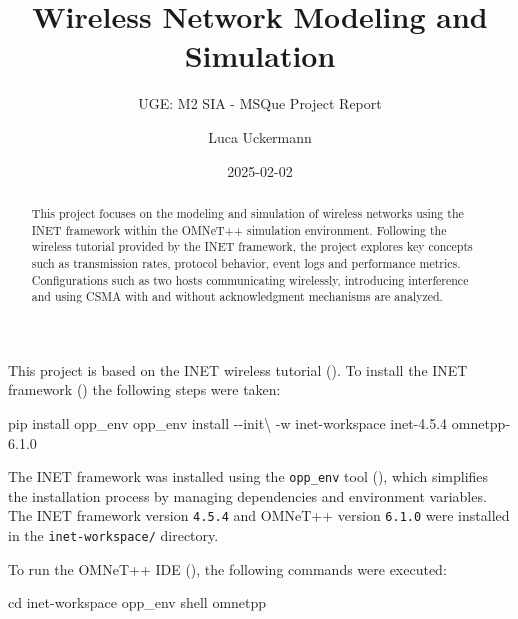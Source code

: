 \documentclass[
  letterpaper,
  DIV=11,
  numbers=noendperiod]{scrartcl}
\title{Wireless Network Modeling and Simulation}
\subtitle{UGE: M2 SIA - MSQue Project Report}
\author{Luca Uckermann}
\date{2025-02-02}
\newenvironment{Shaded}{\begin{snugshade}}{\end{snugshade}}
\newcommand{\AttributeTok}[1]{\textcolor[rgb]{0.40,0.45,0.13}{#1}}
\newcommand{\BuiltInTok}[1]{\textcolor[rgb]{0.00,0.23,0.31}{#1}}
\newcommand{\DataTypeTok}[1]{\textcolor[rgb]{0.68,0.00,0.00}{#1}}
\newcommand{\ExtensionTok}[1]{\textcolor[rgb]{0.00,0.23,0.31}{#1}}
\newcommand{\NormalTok}[1]{\textcolor[rgb]{0.00,0.23,0.31}{#1}}
\renewcommand*\contentsname{Table of contents}
\newcommand\contentsname{Table of contents}
\begin{document}
\maketitle
\begin{abstract}
This project focuses on the modeling and simulation of wireless networks
using the INET framework within the OMNeT++ simulation environment.
Following the wireless tutorial provided by the INET framework, the
project explores key concepts such as transmission rates, protocol
behavior, event logs and performance metrics. Configurations such as two
hosts communicating wirelessly, introducing interference and using CSMA
with and without acknowledgment mechanisms are analyzed.
\end{abstract}

\renewcommand*\contentsname{Table of contents}
{
\hypersetup{linkcolor=}
\setcounter{tocdepth}{2}
\tableofcontents
}

This project is based on the INET wireless tutorial
(). To
install the INET framework () the following steps were taken:

\begin{Shaded}
\begin{Highlighting}[]
\ExtensionTok{pip}\NormalTok{ install opp\_env}
\ExtensionTok{opp\_env}\NormalTok{ install }\AttributeTok{{-}{-}init}\DataTypeTok{\textbackslash{}}
  \AttributeTok{{-}w}\NormalTok{ inet{-}workspace inet{-}4.5.4 omnetpp{-}6.1.0}
\end{Highlighting}
\end{Shaded}

The INET framework was installed using the \texttt{opp\_env} tool
(), which simplifies the
installation process by managing dependencies and environment variables.
The INET framework version \texttt{4.5.4} and OMNeT++ version
\texttt{6.1.0} were installed in the \texttt{inet-workspace/} directory.

To run the OMNeT++ IDE (), the
following commands were executed:

\begin{Shaded}
\begin{Highlighting}[]
\BuiltInTok{cd}\NormalTok{ inet{-}workspace}
\ExtensionTok{opp\_env}\NormalTok{ shell}
\ExtensionTok{omnetpp}
\end{Highlighting}
\end{Shaded}
\end{document}
